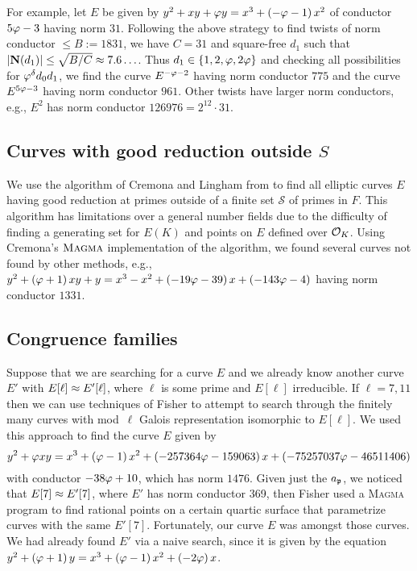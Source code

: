 \documentclass{amsart}
\begin{document}
For example, let $E$ be given by $y^2 + xy + \varphi{}y = x^3 +
\left(-\varphi{} - 1\right)x^2 $ of conductor $5\varphi - 3$ having norm $31$.
Following the above strategy to find twists of norm conductor $\leq
B := 1831$, we have $C=31$ and square-free $d_1$ such that
$|\mathbf{N}(d_1)| \leq \sqrt{B/C} \approx 7.6\ldots$. Thus $d_1 \in \{1, 2,
\varphi, 2\varphi\}$ and checking all possibilities for
$\varphi^{\delta} d_0 d_1$, we find the curve $E^{-\varphi-2}$ having
norm conductor $775$ and the curve $E^{5\varphi-3}$ having norm conductor
$961$. Other twists have larger norm conductors, e.g., $E^2$ has norm
conductor $126976=2^{12}\cdot 31$.


\subsection{Curves with good reduction outside $S$}

We use the algorithm of Cremona and Lingham from
\cite{cremona-lingham} to find all elliptic curves $E$ having good
reduction at primes outside of a finite set $\mathcal{S}$ of primes in
$F$. This algorithm has limitations over a general number
fields due to the difficulty of finding a generating set for $E(K)$ and
points on $E$ defined over $\mathcal{O}_K$.
Using Cremona's $\textsc{Magma}$ implementation of the algorithm, we 
found several curves not found by other methods, e.g.,  
$y^2 + \left(\varphi{} +  1\right)xy + y = x^3 -x^2 + \left(-19 \varphi{} - 
 39\right)x + \left(-143 \varphi{} - 4\right)$ 
having norm conductor $1331$.

\subsection{Congruence families}
Suppose that we are searching for a curve $E$ and we already know
another curve $E'$ with $E[\ell] \approx E'[\ell]$, where $\ell$ is
some prime and $E[\ell]$ irreducible.  If $\ell=7,11$ then we can use
techniques of Fisher \cite{fisher:families_cong} to attempt to search
through the finitely many curves with mod~$\ell$ Galois representation
isomorphic to $E[\ell]$.
We used this approach to find the curve $E$ given by
\begin{equation}\label{equation:fisher-curve}
y^2 + \varphi{}xy = x^3 + \left(\varphi{} - 1\right)x^2 + \left(-257364 \varphi{} - 159063\right)x + \left(-75257037 \varphi{} - 46511406\right)
\end{equation}
with conductor $-38 \varphi + 10$, which has norm $1476$.  Given just the $a_{\mathfrak{p}}$, we noticed that
$E[7] \approx E'[7]$, where $E'$ has norm conductor 369, then Fisher
used a \textsc{Magma} program to find rational points on a certain
quartic surface that parametrize curves with the same $E'[7]$.
Fortunately, our curve $E$ was amongst those curves.
We had already found $E'$ via a naive search, since it is given
by the equation $y^2 + \left(\varphi{} + 1\right)y = x^3 + \left(\varphi{} - 1\right)x^2 + \left(-2 \varphi{}\right)x$.
\end{document}
